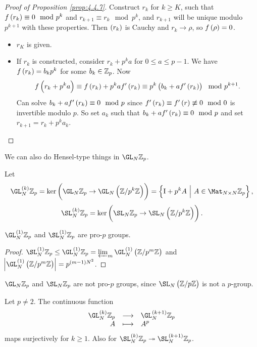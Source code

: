 \begin{proof}[Proof of Proposition \ref{prop:4.4.7}]
Construct $ r_k $ for $ k \ge K $, such that $ f\br{r_k} \equiv 0 \mod p^k $ and $ r_{k + 1} \equiv r_k \mod p^k $, and $ r_{k + 1} $ will be unique modulo $ p^{k + 1} $ with these properties. Then $ \br{r_k} $ is Cauchy and $ r_k \to \rho $, so $ f\br{\rho} = 0 $.
\begin{itemize}
\item $ r_K $ is given.
\item If $ r_k $ is constructed, consider $ r_k + p^ka $ for $ 0 \le a \le p - 1 $. We have $ f\br{r_k} = b_kp^k $ for some $ b_k \in \mathbb{Z}_p $. Now
$$ f\br{r_k + p^ka} \equiv f\br{r_k} + p^kaf'\br{r_k} \equiv p^k\br{b_k + af'\br{r_k}} \mod p^{k + 1}. $$
Can solve $ b_k + af'\br{r_k} \equiv 0 \mod p $ since $ f'\br{r_k} \equiv f'\br{r} \not\equiv 0 \mod 0 $ is invertible modulo $ p $. So set $ a_k $ such that $ b_k + af'\br{r_k} \equiv 0 \mod p $ and set $ r_{k + 1} = r_k + p^ka_k $.
\end{itemize}
\end{proof}

\pagebreak

We can also do Hensel-type things in $ \GL_N \ZZ_p $.

\begin{definition}
Let
$$ \GL_N^{\br{k}} \ZZ_p = \ker \br{\GL_N \ZZ_p \to \GL_N \br{\ZZ / p^k\ZZ}} = \cbr{\I + p^kA \st A \in \Mat_{N \times N} \ZZ_p}, $$
$$ \SL_N^{\br{k}} \ZZ_p = \ker \br{\SL_N \ZZ_p \to \SL_N \br{\ZZ / p^k\ZZ}}. $$
\end{definition}

\begin{proposition}
$ \GL_N^{\br{1}} \ZZ_p $ and $ \SL_N^{\br{1}} \ZZ_p $ are pro-$ p $ groups.
\end{proposition}

\begin{proof}
$ \SL_N^{\br{1}} \ZZ_p \le \GL_N^{\br{1}} \ZZ_p = \varprojlim_m \GL_N^{\br{1}} \br{\ZZ / p^m\ZZ} $ and $ \abs{\GL_N^{\br{1}} \br{\ZZ / p^m\ZZ}} = p^{\br{m - 1}N^2} $.
\end{proof}

\begin{remark}
$ \GL_N \ZZ_p $ and $ \SL_N \ZZ_p $ are not pro-$ p $ groups, since $ \SL_N \br{\ZZ / p\ZZ} $ is not a $ p $-group.
\end{remark}

\begin{proposition}
Let $ p \ne 2 $. The continuous function
$$ \function{\GL_N^{\br{k}} \ZZ_p}{\GL_N^{\br{k + 1}} \ZZ_p}{A}{A^p} $$
maps surjectively for $ k \ge 1 $. Also for $ \SL_N^{\br{k}} \ZZ_p \twoheadrightarrow \SL_N^{\br{k + 1}} \ZZ_p $.
\end{proposition}

